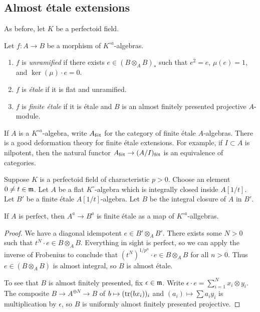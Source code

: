 \subsection{Almost \'etale extensions}

As before, let $K$ be a perfectoid field. 

\begin{definition}
Let $f:A\to B$ be a morphism of $K^{\circ a}$-algebras. 
\begin{enumerate}
  \item $f$ is \emph{unramified} if there exists $e\in (B\otimes_A B)_\ast$ 
    such that $e^2=e$, $\mu(e)=1$, and $\ker(\mu)\cdot e=0$. 
  \item $f$ is \emph{\'etale} if it is flat and unramified. 
  \item $f$ is \emph{finite \'etale} if it is \'etale and $B$ is an almost finitely 
presented projective $A$-module. 
\end{enumerate}
\end{definition}

If $A$ is a $K^{\circ a}$-algebra, write $A_{\textnormal{f\'et}}$ for the category of finite 
\'etale $A$-algebras. There is a good deformation theory for finite \'etale 
extensions. For example, if $I\subset A$ is nilpotent, then the natural functor 
$A_{\textnormal{f\'et}} \to (A/I)_{\textnormal{f\'et}}$ is an equivalence of categories. 

Suppose $K$ is a perfectoid field of characteristic $p>0$. Choose an element 
$0\ne t\in\mathfrak{m}$. Let $A$ be a flat $K^\circ$-algebra which is integrally 
closed inside $A[1/t]$. Let $B'$ be a finite \'etale $A[1/t]$-algebra. Let $B$ 
be the integral closure of $A$ in $B'$. 

\begin{proposition}
If $A$ is perfect, then $A^a \to B^a$ is finite \'etale as a map of 
$K^{\circ a}$-allgebras. 
\end{proposition}
\begin{proof}
We have a diagonal idempotent $e\in B'\otimes_A B'$. There exists 
some $N>0$ such that $t^N\cdot e\in B\otimes_A B$. Everything in sight is 
perfect, so we can apply the inverse of Frobenius to conclude that 
$(t^N)^{1/p^n}\cdot e\in B\otimes_A B$ for all $n>0$. Thus  
$e\in (B\otimes_A B)$ is almost integral, so $B$ is almost \'etale. 

To see that $B$ is almost finitely presented, fix $\epsilon\in\mathfrak{m}$. Write 
$\epsilon\cdot e = \sum_{i=1}^N x_i\otimes y_i$. The composite 
$B\to A^{\oplus N} \to B$ of $b\mapsto (\operatorname{tr}(b x_i))_i$ and 
$(a_i)\mapsto \sum a_i y_i$ is multiplication by $\epsilon$, so $B$ is uniformly almost 
finitely presented projective. 
\end{proof}
